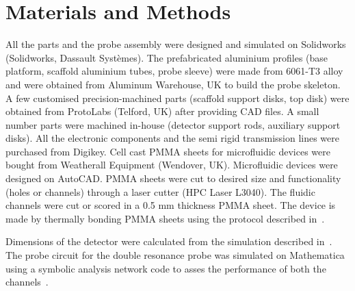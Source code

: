 \documentclass[preprint,12pt]{article}
\begin{document}
\section{Materials and Methods}
All the parts and the probe assembly were designed and simulated on Solidworks (Solidworks, Dassault Syst\`{e}mes). The prefabricated aluminium profiles (base platform, scaffold aluminium tubes, probe sleeve) were made from 6061-T3 alloy and were obtained from Aluminum Warehouse, UK to build the probe skeleton. A few customised precision-machined parts (scaffold support disks, top disk) were obtained from ProtoLabs (Telford, UK) after providing CAD files. A small number parts were machined in-house (detector support rods, auxiliary support disks). All the electronic components and the semi rigid transmission lines were purchased from Digikey. Cell cast PMMA sheets for microfluidic devices were bought from Weatherall Equipment (Wendover, UK). Microfluidic devices were designed on AutoCAD. PMMA sheets were cut to desired size and functionality (holes or channels) through a laser cutter (HPC Laser L3040). The fluidic channels were cut or scored in a 0.5 mm thickness PMMA sheet. The device is made by thermally bonding PMMA sheets using the protocol described in~\cite{yilmaz_bonding}.\par
Dimensions of the detector were calculated from the simulation described in~\cite{gream_2016}. The probe circuit for the double resonance probe was simulated on Mathematica using a symbolic analysis network code to asses the performance of both the channels~\cite{gream-thesis}.\par
\end{document}
